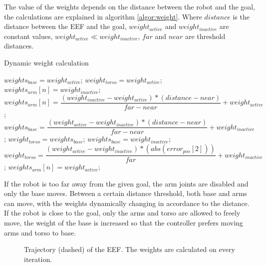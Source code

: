 The value of the weights depends on the distance between the robot and the goal, the calculations are explained in algorithm \ref{algor:weight}. Where $distance$ is the distance between the EEF and the goal, $weight_{active}$ and $weight_{inactive}$ are constant values, $weight_{active} \ll weight_{inactive}$, $far$ and $near$ are threshold distances.

\begin{algorithm}[t!]
	\caption{Dynamic weight calculation}\label{algor:weight}
	\begin{algorithmic}[1]
		\vspace{2pt}
		\vspace{2pt}
		\State $weights_{base} = weight_{active}$;
		\State $weight_{torso} = weight_{active}$;
		\vspace{2pt}
		\State $weights_{arm}[n] = weight_{inactive}$;
		\EndFor
		\vspace{3pt}
		\State $weights_{arm}[n] = \dfrac{(weight_{inactive} - weight_{active})*(distance - near)}{far - near} + weight_{active}$;
		\EndFor
		\State $weights_{base} = \dfrac{(weight_{active} - weight_{inactive})*(distance - near)}{far - near} + weight_{inactive}$;
		\State $weight_{torso} = weights_{base}$;
		\Else
		\vspace{2pt}
		\State $weights_{base} = weight_{inactive}$;
		\vspace{2pt}
		\State $weight_{torso} = \dfrac{(weight_{active} - weight_{inactive})*(abs(error_{pos}[2]))}{far} + weight_{inactive}$;
		\vspace{2pt}
			\State $weights_{arm}[n] = weight_{active}$;
		\EndFor
		\EndIf
		\vspace{-1pt}
	\end{algorithmic}
\end{algorithm}

If the robot is too far away from the given goal, the arm joints are disabled and only the base moves. Between a certain distance threshold, both base and arms can move, with the weights dynamically changing in accordance to the distance. If the robot is close to the goal, only the arms and torso are allowed to freely move, the weight of the base is increased so that the controller prefers moving arms and torso to base.
\begin{figure}[H]
	\centering
	\begin{subfigure}[][Isometric view]
		{\texttt{[image: boxy/Trajectory01.png]}}
	\end{subfigure}
	\begin{subfigure}[][Top view]
		{\texttt{[image: boxy/TrajectoryParts.png]}}
	\end{subfigure}
	\vspace{-10pt}
	\caption[Boxy's Trajectory]{Trajectory (dashed) of the EEF. The weights are calculated on every iteration.}
	\vspace{-15pt}
	\label{fig:traj1}
\end{figure}

